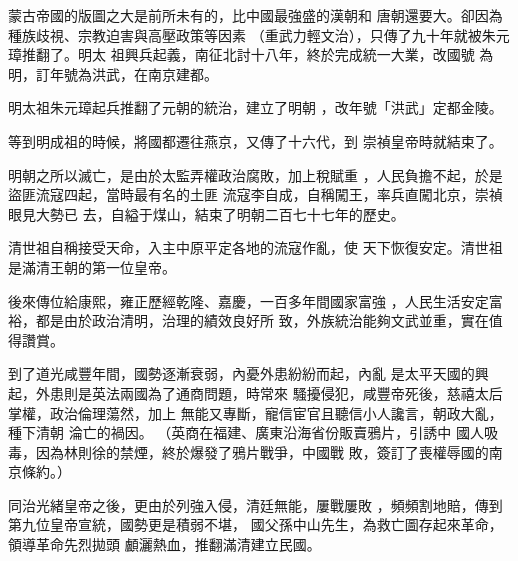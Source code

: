 \documentclass[avery5371,grid]{flashcards}
\begin{document}
{蒙古帝國的版圖之大是前所未有的，比中國最強盛的漢朝和
唐朝還要大。卻因為種族歧視、宗教迫害與高壓政策等因素
（重武力輕文治），只傳了九十年就被朱元璋推翻了。明太
祖興兵起義，南征北討十八年，終於完成統一大業，改國號
為明，訂年號為洪武，在南京建都。} %
{} %






{明太祖朱元璋起兵推翻了元朝的統治，建立了明朝
，改年號「洪武」定都金陵。} %
{} %

{等到明成祖的時候，將國都遷往燕京，又傳了十六代，到
崇禎皇帝時就結束了。} %
{} %

{明朝之所以滅亡，是由於太監弄權政治腐敗，加上稅賦重
，人民負擔不起，於是盜匪流寇四起，當時最有名的土匪
流寇李自成，自稱闖王，率兵直闖北京，崇禎眼見大勢已
去，自縊于煤山，結束了明朝二百七十七年的歷史。} %
{} %

{清世祖自稱接受天命，入主中原平定各地的流寇作亂，使
天下恢復安定。清世祖是滿清王朝的第一位皇帝。} %
{} %

{後來傳位給康熙，雍正歷經乾隆、嘉慶，一百多年間國家富強
，人民生活安定富裕，都是由於政治清明，治理的績效良好所
致，外族統治能夠文武並重，實在值得讚賞。} %
{} %

{到了道光咸豐年間，國勢逐漸衰弱，內憂外患紛紛而起，內亂
是太平天國的興起，外患則是英法兩國為了通商問題，時常來
騷擾侵犯，咸豐帝死後，慈禧太后掌權，政治倫理蕩然，加上
無能又專斷，寵信宦官且聽信小人讒言，朝政大亂，種下清朝
淪亡的禍因。} %
{（英商在福建、廣東沿海省份販賣鴉片，引誘中
國人吸毒，因為林則徐的禁煙，終於爆發了鴉片戰爭，中國戰
敗，簽訂了喪權辱國的南京條約。）} %





{同治光緒皇帝之後，更由於列強入侵，清廷無能，屢戰屢敗
，頻頻割地賠，傳到第九位皇帝宣統，國勢更是積弱不堪，
國父孫中山先生，為救亡圖存起來革命，領導革命先烈拋頭
顱灑熱血，推翻滿清建立民國。} %
{} %
\end{document}
